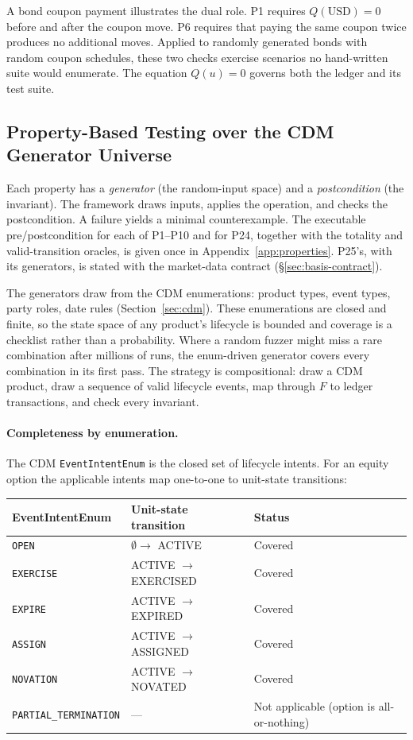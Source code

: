 A bond coupon payment illustrates the dual role. P1 requires $Q(\mathrm{USD})=0$ before and after the coupon move. P6 requires that paying the same coupon twice produces no additional moves. Applied to randomly generated bonds with random coupon schedules, these two checks exercise scenarios no hand-written suite would enumerate. The equation $Q(u)=0$ governs both the ledger and its test suite.

\subsection{Property-Based Testing over the CDM Generator Universe}
\label{sec:invariants-pbt}

Each property has a \emph{generator} (the random-input space) and a \emph{postcondition} (the invariant). The framework draws inputs, applies the operation, and checks the postcondition. A failure yields a minimal counterexample. The executable pre/postcondition for each of P1--P10 and for P24, together with the totality and valid-transition oracles, is given once in Appendix~\ref{app:properties}. P25's, with its generators, is stated with the market-data contract (\S\ref{sec:basis-contract}).

The generators draw from the CDM enumerations: product types, event types, party roles, date rules (Section~\ref{sec:cdm}). These enumerations are closed and finite, so the state space of any product's lifecycle is bounded and coverage is a checklist rather than a probability. Where a random fuzzer might miss a rare combination after millions of runs, the enum-driven generator covers every combination in its first pass. The strategy is compositional: draw a CDM product, draw a sequence of valid lifecycle events, map through $F$ to ledger transactions, and check every invariant.

\paragraph{Completeness by enumeration.} The CDM \texttt{EventIntentEnum} is the closed set of lifecycle intents. For an equity option the applicable intents map one-to-one to unit-state transitions:

\begin{center}
\begin{tabular}{lll}
\toprule
\textbf{EventIntentEnum} & \textbf{Unit-state transition} & \textbf{Status} \\
\midrule
\texttt{OPEN} & $\emptyset\to$ ACTIVE & Covered \\
\texttt{EXERCISE} & ACTIVE $\to$ EXERCISED & Covered \\
\texttt{EXPIRE} & ACTIVE $\to$ EXPIRED & Covered \\
\texttt{ASSIGN} & ACTIVE $\to$ ASSIGNED & Covered \\
\texttt{NOVATION} & ACTIVE $\to$ NOVATED & Covered \\
\texttt{PARTIAL\_TERMINATION} & --- & Not applicable (option is all-or-nothing) \\
\bottomrule
\end{tabular}
\end{center}

